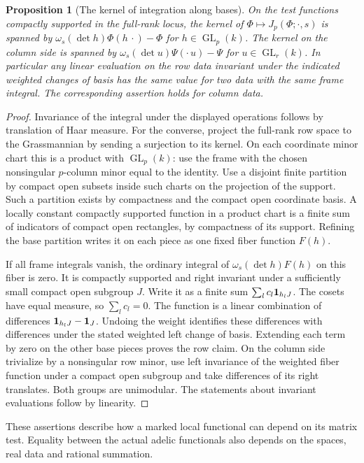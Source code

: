\documentclass[a4paper,11pt]{article}
\newtheorem{proposition}{Proposition}[section]
\theoremstyle{definition}
\theoremstyle{remark}
\numberwithin{equation}{section}
\begin{document}
\begin{proposition}[The kernel of integration along bases]
\leavevmode\label{prop:framecoinvariants835}
On the test functions compactly supported in the full-rank
locus, the kernel of \(\Phi\mapsto J_p(\Phi;\cdot,s)\)
is spanned by
\(\omega_s(\det h)\Phi(h\,\cdot)-\Phi\) for
\(h\in\operatorname{GL}_p(k)\).
The kernel on the column side is spanned by
\(\omega_s(\det u)\Psi(\cdot\,u)-\Psi\) for
\(u\in\operatorname{GL}_r(k)\).
In particular any linear evaluation on the row data invariant
under the indicated weighted changes of basis has the same
value for two data with the same frame integral. The
corresponding assertion holds for column data.
\end{proposition}
\begin{proof}
Invariance of the integral under the displayed operations
follows by translation of Haar measure. For the converse,
project the full-rank row space to the Grassmannian by
sending a surjection to its kernel. On each coordinate minor
chart this is a product with \(\operatorname{GL}_p(k)\):
use the frame with the chosen nonsingular \(p\)-column
minor equal to the identity. Use a disjoint finite partition
by compact open subsets inside such charts on the projection
of the support. Such a partition exists by compactness
and the compact open coordinate basis. A locally constant
compactly supported function in a product chart is a finite
sum of indicators of compact open rectangles, by compactness
of its support. Refining the base partition writes it on
each piece as one fixed fiber function \(F(h)\).

If all frame integrals vanish, the ordinary integral of
\(\omega_s(\det h)F(h)\) on this fiber is zero.
It is compactly supported and right invariant under a
sufficiently small compact open subgroup \(J\). Write it
as a finite sum \(\sum_l c_l{\bf1}_{h_lJ}\). The cosets
have equal measure, so \(\sum_l c_l=0\). The function is
a linear combination of differences
\({\bf1}_{h_lJ}-{\bf1}_J\). Undoing the weight identifies
these differences with differences under the stated weighted
left change of basis. Extending each term by zero on the
other base pieces proves the row claim. On the column
side trivialize by a nonsingular row minor, use left
invariance of the weighted fiber function under a compact
open subgroup and take differences of its right translates.
Both groups are unimodular. The statements about invariant
evaluations follow by linearity.
\end{proof}

These assertions describe how a marked local functional
can depend on its matrix test. Equality between the actual
adelic functionals also depends on the spaces, real data
and rational summation.
\clearpage
\end{document}
